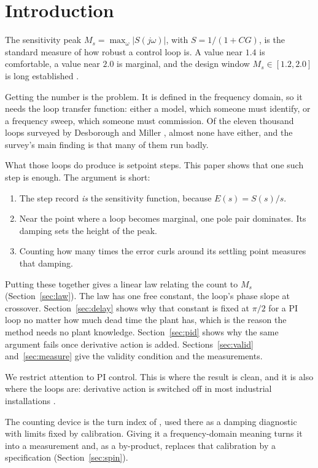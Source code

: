 \documentclass[final,3p,times,twocolumn]{elsarticle}
\begin{document}
\section{Introduction}

The sensitivity peak $M_s=\max_\omega|S(j\omega)|$, with $S=1/(1+CG)$,
is the standard measure of how robust a control loop is. A value near
$1.4$ is comfortable, a value near $2.0$ is marginal, and the design
window $M_s\in[1.2,2.0]$ is long established
\cite{AstromHagglund2004,Skogestad2003}.

Getting the number is the problem. It is defined in the frequency
domain, so it needs the loop transfer function: either a model, which
someone must identify, or a frequency sweep, which someone must
commission. Of the eleven thousand loops surveyed by Desborough and
Miller \cite{Desborough2002}, almost none have either, and the survey's
main finding is that many of them run badly.

What those loops do produce is setpoint steps. This paper shows that one
such step is enough. The argument is short:

\begin{enumerate}[label=(\roman*)]
\item The step record \emph{is} the sensitivity function, because
$E(s)=S(s)/s$.
\item Near the point where a loop becomes marginal, one pole pair
dominates. Its damping sets the height of the peak.
\item Counting how many times the error curls around its settling point
measures that damping.
\end{enumerate}

Putting these together gives a linear law relating the count to $M_s$
(Section~\ref{sec:law}). The law has one free constant, the loop's phase
slope at crossover. Section~\ref{sec:delay} shows why that constant is
fixed at $\pi/2$ for a PI loop no matter how much dead time the plant
has, which is the reason the method needs no plant knowledge.
Section~\ref{sec:pid} shows why the same argument fails once derivative
action is added. Sections~\ref{sec:valid} and~\ref{sec:measure} give the
validity condition and the measurements.

We restrict attention to PI control. This is where the result is clean,
and it is also where the loops are: derivative action is switched off in
most industrial installations \cite{AstromHagglund2001}.

The counting device is the turn index of \cite{SPIN}, used there as a
damping diagnostic with limits fixed by calibration. Giving it a
frequency-domain meaning turns it into a measurement and, as a
by-product, replaces that calibration by a specification
(Section~\ref{sec:spin}).
\end{document}
